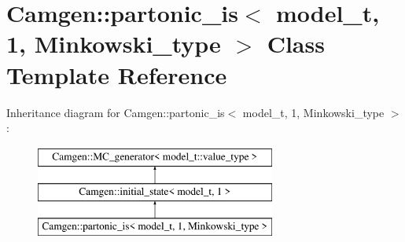\hypertarget{a00407}{\section{Camgen\-:\-:partonic\-\_\-is$<$ model\-\_\-t, 1, Minkowski\-\_\-type $>$ Class Template Reference}
\label{a00407}
}
Inheritance diagram for Camgen\-:\-:partonic\-\_\-is$<$ model\-\_\-t, 1, Minkowski\-\_\-type $>$\-:\begin{figure}[H]
\begin{center}
\leavevmode
\includegraphics[height=3.000000cm]{a00407}
\end{center}
\end{figure}
